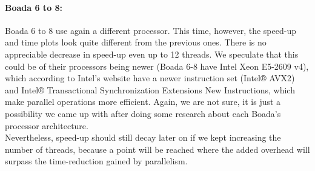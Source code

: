 \documentclass[12]{article}
\begin{document}
\bigskip
\paragraph{Boada 6 to 8:}
Boada 6 to 8 use again a different processor. This time, however, the speed-up and time plots look quite different from the previous ones. There is no appreciable decrease in speed-up even up to 12 threads. We speculate that this could be of their processors being newer (Boada 6-8 have Intel Xeon E5-2609 v4), which according to Intel's website have a newer instruction set (Intel® AVX2) and Intel® Transactional Synchronization Extensions New Instructions, which make parallel operations more efficient. Again, we are not sure, it is just a possibility we came up with after doing some research about each Boada's processor architecture. \\
Nevertheless, speed-up should still decay later on if we kept increasing the number of threads, because a point will be reached where the added overhead will surpass the time-reduction gained by parallelism.
\end{document}
